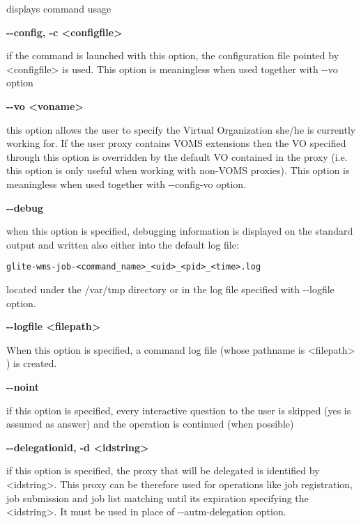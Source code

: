 displays command usage




\textbf{-{}-config, -c <configfile>}

if the command is launched with this option, the configuration file pointed by <configfile> is used. This option is meaningless when used together with -{}-vo option




\textbf{-{}-vo <voname>}

this option allows the user to specify the Virtual Organization she/he is currently working for.
If the user proxy contains VOMS extensions then the VO specified through this option is overridden by the
default VO contained in the proxy (i.e. this option is only useful when working with non-VOMS proxies).
This option is meaningless when used together with -{}-config-vo option.




\textbf{-{}-debug}

when this option is specified, debugging information is displayed on the standard output and written also either into the default log file:


\begin{verbatim}
glite-wms-job-<command_name>_<uid>_<pid>_<time>.log
\end{verbatim}

located under the /var/tmp  directory or in the log file specified with -{}-logfile option.




\textbf{-{}-logfile <filepath>}

When this option is specified, a command log file (whose pathname is <filepath> ) is created.



\textbf{-{}-noint}

if this option is specified, every interactive question to the user is skipped 
(yes is assumed as answer) and the operation is continued (when possible)





\textbf{-{}-delegationid, -d <idstring>}

if this option is specified, the proxy that will be delegated is identified by 
<idstring>. This proxy can be therefore used for operations like job registration, 
job submission and job list matching until its expiration specifying the <idstring>. 
It must be used in place of -{}-autm-delegation option.





